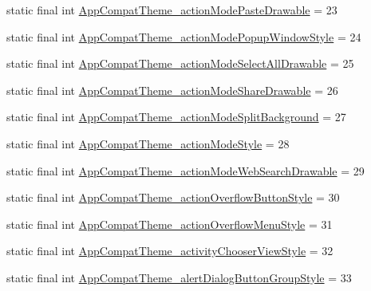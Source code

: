 \begin{DoxyCompactItemize}
static final int \mbox{\hyperlink{classandroid_1_1support_1_1v7_1_1appcompat_1_1R_1_1styleable_a3b4a44d4a3bf772d0bd2d1c52a936410}{App\+Compat\+Theme\+\_\+action\+Mode\+Paste\+Drawable}} = 23
\item 
static final int \mbox{\hyperlink{classandroid_1_1support_1_1v7_1_1appcompat_1_1R_1_1styleable_a8d98d8c2f53bcb89baa6fd0c634ab512}{App\+Compat\+Theme\+\_\+action\+Mode\+Popup\+Window\+Style}} = 24
\item 
static final int \mbox{\hyperlink{classandroid_1_1support_1_1v7_1_1appcompat_1_1R_1_1styleable_a41fe841d7bc11225c18c0c827d268c8a}{App\+Compat\+Theme\+\_\+action\+Mode\+Select\+All\+Drawable}} = 25
\item 
static final int \mbox{\hyperlink{classandroid_1_1support_1_1v7_1_1appcompat_1_1R_1_1styleable_a0be771e2eec60d3213d846c193207c7d}{App\+Compat\+Theme\+\_\+action\+Mode\+Share\+Drawable}} = 26
\item 
static final int \mbox{\hyperlink{classandroid_1_1support_1_1v7_1_1appcompat_1_1R_1_1styleable_a55686d3f8a4a36da4600b95a031ae5a8}{App\+Compat\+Theme\+\_\+action\+Mode\+Split\+Background}} = 27
\item 
static final int \mbox{\hyperlink{classandroid_1_1support_1_1v7_1_1appcompat_1_1R_1_1styleable_a7ca0a5b79ce6df69ed747815cfbc1393}{App\+Compat\+Theme\+\_\+action\+Mode\+Style}} = 28
\item 
static final int \mbox{\hyperlink{classandroid_1_1support_1_1v7_1_1appcompat_1_1R_1_1styleable_aa4d2250c23905d8eb9283eb41b538c9b}{App\+Compat\+Theme\+\_\+action\+Mode\+Web\+Search\+Drawable}} = 29
\item 
static final int \mbox{\hyperlink{classandroid_1_1support_1_1v7_1_1appcompat_1_1R_1_1styleable_ae43e133d0d034c207d693944cfa71589}{App\+Compat\+Theme\+\_\+action\+Overflow\+Button\+Style}} = 30
\item 
static final int \mbox{\hyperlink{classandroid_1_1support_1_1v7_1_1appcompat_1_1R_1_1styleable_a10ebea615be04732b64922dd7e32746e}{App\+Compat\+Theme\+\_\+action\+Overflow\+Menu\+Style}} = 31
\item 
static final int \mbox{\hyperlink{classandroid_1_1support_1_1v7_1_1appcompat_1_1R_1_1styleable_a2d98c8d3e08a265b2cbdde0a14c9beae}{App\+Compat\+Theme\+\_\+activity\+Chooser\+View\+Style}} = 32
\item 
static final int \mbox{\hyperlink{classandroid_1_1support_1_1v7_1_1appcompat_1_1R_1_1styleable_a0961260b8f5e7a60a37468ab95220752}{App\+Compat\+Theme\+\_\+alert\+Dialog\+Button\+Group\+Style}} = 33
\item 

\end{DoxyCompactItemize}
